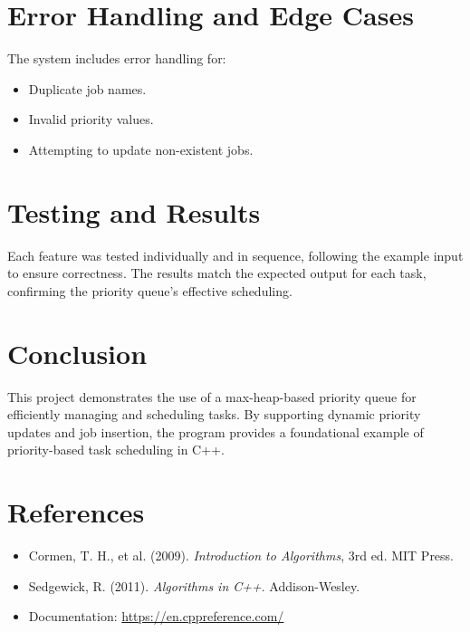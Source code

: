 \documentclass{article}
\begin{document}
\section{Error Handling and Edge Cases}
The system includes error handling for:
\begin{itemize}
    \item Duplicate job names.
    \item Invalid priority values.
    \item Attempting to update non-existent jobs.
\end{itemize}

\section{Testing and Results}
Each feature was tested individually and in sequence, following the example input to ensure correctness. The results match the expected output for each task, confirming the priority queue's effective scheduling.

\section{Conclusion}
This project demonstrates the use of a max-heap-based priority queue for efficiently managing and scheduling tasks. By supporting dynamic priority updates and job insertion, the program provides a foundational example of priority-based task scheduling in C++.

\section*{References}
\begin{itemize}
    \item Cormen, T. H., et al. (2009). \textit{Introduction to Algorithms}, 3rd ed. MIT Press.
    \item Sedgewick, R. (2011). \textit{Algorithms in C++}. Addison-Wesley.
    \item Documentation: \url{https://en.cppreference.com/}
\end{itemize}
\end{document}

